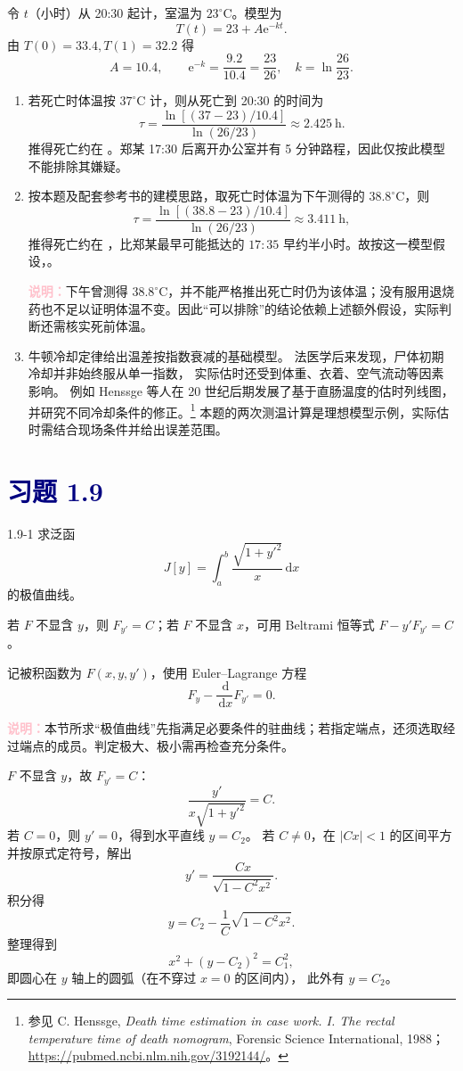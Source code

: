 \documentclass[UTF8,a4paper,11pt]{ctexart}
\newcommand{\dd}{\,\mathrm d}
\newcommand{\e}{\mathrm e}
\newcommand{\note}[1]{\par\smallskip\noindent\textcolor{pink}{\bfseries 说明：}#1\par\smallskip}
\newcommand{\sect}[1]{\section*{\textcolor{navy}{习题 #1}}}
\begin{document}
\begin{solution}
令 $t$（小时）从 20:30 起计，室温为 $23^\circ\mathrm C$。模型为
\[
T(t)=23+A\e^{-kt}.
\]
由 $T(0)=33.4,T(1)=32.2$ 得
\[
A=10.4,\qquad \e^{-k}=\frac{9.2}{10.4}=\frac{23}{26},
\quad k=\ln\frac{26}{23}.
\]
\begin{enumerate}[label=(\arabic*)]
\item 若死亡时体温按 $37^\circ\mathrm C$ 计，则从死亡到 20:30 的时间为
\[
\tau=\frac{\ln[(37-23)/10.4]}{\ln(26/23)}\approx2.425\ \mathrm h.
\]
推得死亡约在 。郑某 17:30 后离开办公室并有 5 分钟路程，因此仅按此模型不能排除其嫌疑。
\item 按本题及配套参考书的建模思路，取死亡时体温为下午测得的
$38.8^\circ\mathrm C$，则
\[
\tau=\frac{\ln[(38.8-23)/10.4]}{\ln(26/23)}\approx3.411\ \mathrm h,
\]
推得死亡约在 ，比郑某最早可能抵达的
$17{:}35$ 早约半小时。故按这一模型假设，。
\note{下午曾测得 $38.8^\circ\mathrm C$，并不能严格推出死亡时仍为该体温；没有服用退烧药也不足以证明体温不变。因此“可以排除”的结论依赖上述额外假设，实际判断还需核实死前体温。}
\item 牛顿冷却定律给出温差按指数衰减的基础模型。
法医学后来发现，尸体初期冷却并非始终服从单一指数，
实际估时还受到体重、衣着、空气流动等因素影响。
例如 Henssge 等人在 20 世纪后期发展了基于直肠温度的估时列线图，
并研究不同冷却条件的修正。\footnote{参见 C. Henssge,
\emph{Death time estimation in case work. I. The rectal temperature time of death nomogram},
Forensic Science International, 1988；
\url{https://pubmed.ncbi.nlm.nih.gov/3192144/}。}
本题的两次测温计算是理想模型示例，实际估时需结合现场条件并给出误差范围。
\end{enumerate}
\end{solution}


\sect{1.9}
\begin{problem}{1.9-1}
求泛函
  \[
    J[y]=\int_a^b\frac{\sqrt{1+y'^2}}{x}\dd x
  \]
  的极值曲线。
\end{problem}

\begin{analysis}
若 $F$ 不显含 $y$，则 $F_{y'}=C$；若 $F$ 不显含 $x$，可用 Beltrami 恒等式 $F-y'F_{y'}=C$。
\end{analysis}

\begin{solution}
记被积函数为 $F(x,y,y')$，使用 Euler--Lagrange 方程
\[
F_y-\frac{\dd}{\dd x}F_{y'}=0.
\]
\note{本节所求“极值曲线”先指满足必要条件的驻曲线；若指定端点，还须选取经过端点的成员。判定极大、极小需再检查充分条件。}

$F$ 不显含 $y$，故 $F_{y'}=C$：
\[
\frac{y'}{x\sqrt{1+y'^2}}=C.
\]
若 $C=0$，则 $y'=0$，得到水平直线 $y=C_2$。
若 $C\ne0$，在 $|Cx|<1$ 的区间平方并按原式定符号，解出
\[
y'=\frac{Cx}{\sqrt{1-C^2x^2}}.
\]
积分得
\[
y=C_2-\frac1C\sqrt{1-C^2x^2}.
\]
整理得到
\[
\boxed{x^2+(y-C_2)^2=C_1^2},
\]
即圆心在 $y$ 轴上的圆弧（在不穿过 $x=0$ 的区间内），
此外有 $\boxed{y=C_2}$。
\end{solution}
\end{document}
